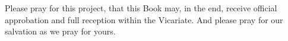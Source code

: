 \vspace{0.5\baselineskip}

Please pray for this project, that this Book may, in the end, receive official approbation and full reception within the Vicariate. And please pray for our salvation as we pray for yours.\\


\vspace{1\baselineskip}


\vspace{1\baselineskip}


